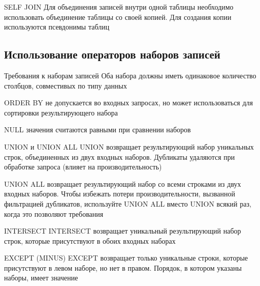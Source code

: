 \documentclass[12pt]{article}
\begin{document}
\begin{defin}{SELF JOIN}
    Для объединения записей внутри одной таблицы необходимо использовать объединение таблицы со своей копией. Для создания копии используются псевдонимы таблиц
\end{defin}

\newpage 

\subsection{Использование операторов наборов записей}

\begin{nota}{Требования к наборам записей}
    Оба набора должны иметь одинаковое количество столбцов, совместивых по типу данных 

    ORDER BY не допускается во входных запросах, но может использоваться для сортировки результирующего набора 

    NULL значения считаются равными при сравнении наборов
\end{nota}

\begin{defin}{UNION и UNION ALL}
    UNION возвращает результирующий набор уникальных строк, объединенных из двух входных наборов. Дубликаты удаляются при обработке запроса (влияет на производительность) 

    UNION ALL возвращает результирующий набор со всеми строками из двух входных наборов. Чтобы избежать потери производительности, вызванной фильтрацией дубликатов, используйте UNION ALL вместо UNION всякий раз, когда это позволяют требования
\end{defin}

\begin{defin}{INTERSECT}
    INTERSECT возвращает уникальный результирующий набор строк, которые присутствуют в обоих входных наборах
\end{defin}

\begin{defin}{EXCEPT (MINUS)}
    EXCEPT возвращает только уникальные строки, которые присутствуют в левом наборе, но нет в правом. Порядок, в котором указаны наборы, имеет значение
\end{defin}
\end{document}
